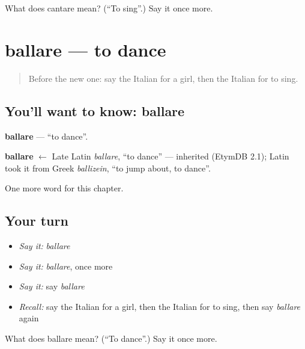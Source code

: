 \begin{tcolorbox}[breakable,colback=teal!4,colframe=teal!35!black,title={Before you move on}]
What does cantare mean? (\textquotedblleft{}To sing\textquotedblright{}.) Say it once more.
\end{tcolorbox}
\section[ballare]{ballare — to dance}

\label{lesson:IT-C47-ballare}



\begin{quote}
Before the new one: say the Italian for a girl, then the Italian for to sing.
\end{quote}

\subsection*{You'll want to know: ballare}
\textbf{ballare} — \textquotedblleft{}to dance\textquotedblright{}.

\begin{cousinweb}
\textbf{ballare} $\leftarrow$ Late Latin \emph{ballare}, \textquotedblleft{}to dance\textquotedblright{} — inherited (EtymDB 2.1); Latin took it from Greek \emph{ballizein}, \textquotedblleft{}to jump about, to dance\textquotedblright{}.
\end{cousinweb}

\begin{grammarlens}[title={What you've built}]
One more word for this chapter.
\end{grammarlens}

\subsection*{Your turn}
\begin{itemize}
\raggedright
  \item \emph{Say it:} \emph{ballare}
  \item \emph{Say it:} \emph{ballare}, once more
  \item \emph{Say it:} say \emph{ballare}
  \item \emph{Recall:} say the Italian for a girl, then the Italian for to sing, then say \emph{ballare} again
\end{itemize}

\begin{tcolorbox}[breakable,colback=teal!4,colframe=teal!35!black,title={Before you move on}]
What does ballare mean? (\textquotedblleft{}To dance\textquotedblright{}.) Say it once more.
\end{tcolorbox}
